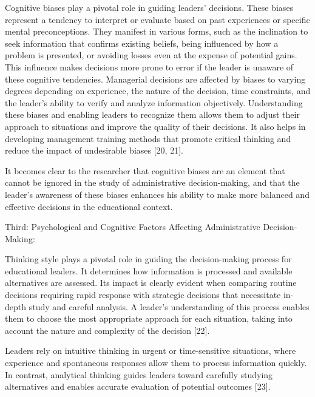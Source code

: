 \documentclass[10pt]{NSP1}
\begin{document}
\par\medskip{}\smallskip

Cognitive biases play a pivotal role in guiding leaders' decisions. These biases represent a tendency to interpret or evaluate based on past experiences or specific mental preconceptions. They manifest in various forms, such as the inclination to seek information that confirms existing beliefs, being influenced by how a problem is presented, or avoiding losses even at the expense of potential gains. This influence makes decisions more prone to error if the leader is unaware of these cognitive tendencies. Managerial decisions are affected by biases to varying degrees depending on experience, the nature of the decision, time constraints, and the leader's ability to verify and analyze information objectively. Understanding these biases and enabling leaders to recognize them allows them to adjust their approach to situations and improve the quality of their decisions. It also helps in developing management training methods that promote critical thinking and reduce the impact of undesirable biases [20, 21].

It becomes clear to the researcher that cognitive biases are an element that cannot be ignored in the study of administrative decision-making, and that the leader’s awareness of these biases enhances his ability to make more balanced and effective decisions in the educational context.

Third: Psychological and Cognitive Factors Affecting Administrative Decision-Making:

\par\medskip{}\smallskip

Thinking style plays a pivotal role in guiding the decision-making process for educational leaders. It determines how information is processed and available alternatives are assessed. Its impact is clearly evident when comparing routine decisions requiring rapid response with strategic decisions that necessitate in-depth study and careful analysis. A leader's understanding of this process enables them to choose the most appropriate approach for each situation, taking into account the nature and complexity of the decision [22].

Leaders rely on intuitive thinking in urgent or time-sensitive situations, where experience and spontaneous responses allow them to process information quickly. In contrast, analytical thinking guides leaders toward carefully studying alternatives and enables accurate evaluation of potential outcomes [23].
\end{document}
